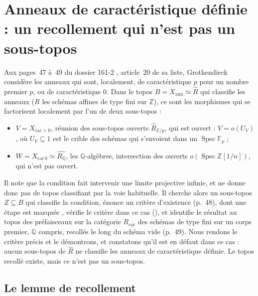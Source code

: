 \section{Anneaux de caractéristique définie : un recollement qui n'est pas un sous-topos}\label{sec:characteristic}

Aux pages~47 à~49 du dossier 161-2 \cite{grothendieck-161-2}, article~20 de sa liste, Grothendieck considère les anneaux qui sont, localement, de caractéristique $p$ pour un nombre premier $p$, ou de caractéristique $0$. Dans le topos $B = X_{\mathrm{ann}} \simeq \widehat R$ qui classifie les anneaux ($R$ les schémas affines de type fini sur $\mathbb Z$), ce sont les morphismes qui se factorisent localement par l'un de deux sous-topos :
\begin{itemize}
\item $V = X_{\mathrm{car}>0}$, réunion des sous-topos ouverts $\widehat R_{\mathbb Z/p}$, qui est ouvert : $V = o(U_V)$, où $U_V \subseteq 1$ est le crible des schémas qui s'envoient dans un $\operatorname{Spec}\mathbb F_p$ ;
\item $W = X_{\mathrm{car}\,0} \simeq \widehat{R_{\mathbb Q}}$, les $\mathbb Q$-algèbres, intersection des ouverts $o(\operatorname{Spec}\mathbb Z[1/n])$, qui n'est pas ouvert.
\end{itemize}
Il note que la condition fait intervenir une limite projective infinie, et ne donne donc pas de topos classifiant par la voie habituelle. Il cherche alors un sous-topos $Z \subseteq B$ qui classifie la condition, énonce un critère d'existence (p.~48), dont une étape est marquée , vérifie le critère dans ce cas (), et identifie le résultat au topos des préfaisceaux sur la catégorie $R_{\mathrm{car}}$ des schémas de type fini sur un corps premier, $\mathbb Q$ compris, recollés le long du schéma vide (p.~49). Nous rendons le critère précis et le démontrons, et constatons qu'il est en défaut dans ce cas : aucun sous-topos de $\widehat R$ ne classifie les anneaux de caractéristique définie. Le topos recollé existe, mais ce n'est pas un sous-topos.

\subsection{Le lemme de recollement}

